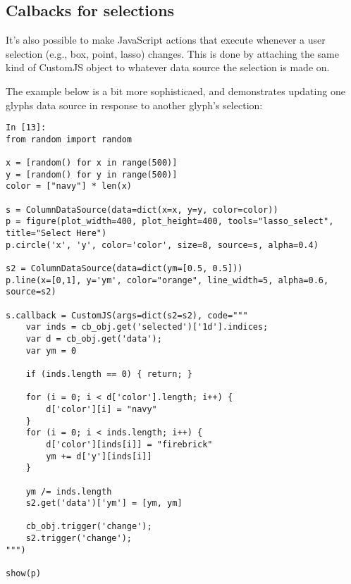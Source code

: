 \documentclass[a4paper,12pt]{article}
\begin{document}
\subsection{Calbacks for selections}
It's also possible to make JavaScript actions that execute whenever a user selection (e.g., box, point, lasso) changes. This is done by attaching the same kind of CustomJS object to whatever data source the selection is made on.

The example below is a bit more sophisticaed, and demonstrates updating one glyphs data source in response to another glyph's selection:
\begin{framed}
\begin{verbatim}
In [13]:
from random import random

x = [random() for x in range(500)]
y = [random() for y in range(500)]
color = ["navy"] * len(x)

s = ColumnDataSource(data=dict(x=x, y=y, color=color))
p = figure(plot_width=400, plot_height=400, tools="lasso_select", title="Select Here")
p.circle('x', 'y', color='color', size=8, source=s, alpha=0.4)

s2 = ColumnDataSource(data=dict(ym=[0.5, 0.5]))
p.line(x=[0,1], y='ym', color="orange", line_width=5, alpha=0.6, source=s2)

s.callback = CustomJS(args=dict(s2=s2), code="""
    var inds = cb_obj.get('selected')['1d'].indices;
    var d = cb_obj.get('data');
    var ym = 0
    
    if (inds.length == 0) { return; }
    
    for (i = 0; i < d['color'].length; i++) {
        d['color'][i] = "navy"
    }
    for (i = 0; i < inds.length; i++) {
        d['color'][inds[i]] = "firebrick"
        ym += d['y'][inds[i]]
    }
    
    ym /= inds.length
    s2.get('data')['ym'] = [ym, ym]
    
    cb_obj.trigger('change');
    s2.trigger('change');
""")

show(p)
	
\end{verbatim}
\end{framed}
 
 
 
\end{document}
